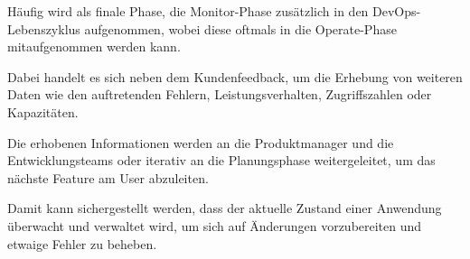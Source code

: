 Häufig wird als finale Phase, die Monitor-Phase zusätzlich in den DevOps-Lebenszyklus aufgenommen, wobei diese oftmals in die Operate-Phase mitaufgenommen werden kann.

Dabei handelt es sich neben dem Kundenfeedback, um die Erhebung von weiteren Daten wie den auftretenden Fehlern, Leistungsverhalten, Zugriffszahlen oder Kapazitäten. \cite{thedev_eight_2019}    

Die erhobenen Informationen werden an die Produktmanager und die Entwicklungsteams oder iterativ an die Planungsphase weitergeleitet, um das nächste Feature am User abzuleiten. \cite[s. 21]{halstenberg_devops_2020} 

Damit kann sichergestellt werden, dass der aktuelle Zustand einer Anwendung überwacht und verwaltet wird, um sich auf Änderungen vorzubereiten und etwaige Fehler zu beheben. \cite[S. 127]{sturm_devops_2017} \\

















 


























